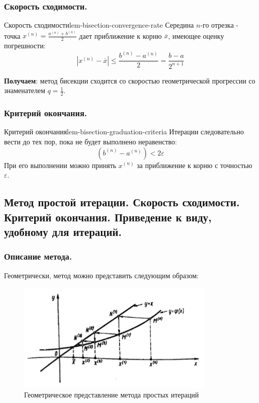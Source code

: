 \documentclass[14pt]{extarticle}
\begin{document}
    \subsubsection{Скорость сходимости.}

        \begin{lemma}{Скорость сходимости}{lem-bisection-convergence-rate}
            Середина $n$-го отрезка - точка $x^{(n)} = \frac{a^{(n)} + b^{(n)}}{2}$ дает приближение к корню $\overline{x}$, имеющее оценку погрешности:
            $$|x^{(n)} - \overline{x}| \leq \frac{b^{(n)} - a^{(n)}}{2} = \frac{b-a}{2^{n + 1}}$$
        \end{lemma}

        \textbf{Получаем}: метод бисекции сходится со скоростью геометрической прогрессии со знаменателем $q = \frac{1}{2}$.


    \subsubsection{Критерий окончания.}

        \begin{lemma}{Критерий окончания}{lem-bisection-graduation-criteria}
            Итерации следовательно вести до тех пор, пока не будет выполнено неравенство:
            $$(b^{(n)} - a^{(n)}) < 2\varepsilon$$
            При его выполнении можно принять $x^{(n)}$ за приближение к корню с точностью $\varepsilon$.
        \end{lemma}

\clearpage
\subsection{Метод простой итерации. Скорость сходимости. Критерий окончания. Приведение к виду, удобному для итераций.}

    \subsubsection{Описание метода.}

        Геометрически, метод можно представить следующим образом:

        \begin{figure}[H]
            \centering
            \includegraphics[scale=0.7]{images/simple-iterations-ex.png}
            \caption{Геометрическое представление метода простых итераций}
            \label{fig:simple-iterations-example}
        \end{figure}
\end{document}
